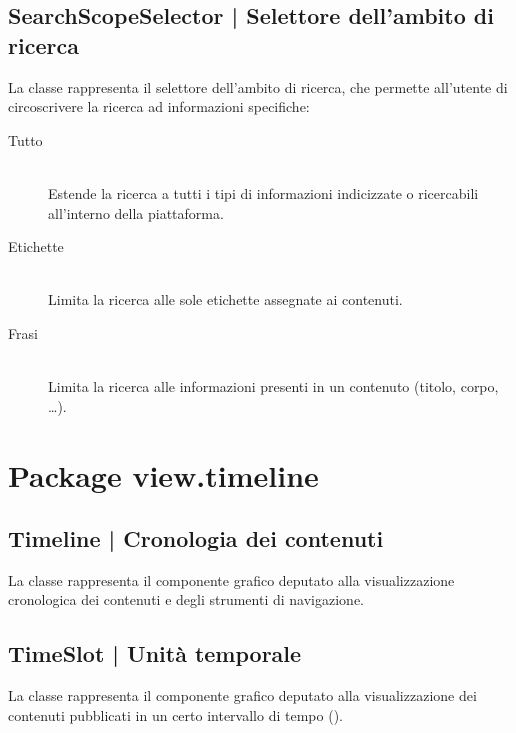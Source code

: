 \documentclass[10pt,a4paper,headinclude,footinclude,hidelinks]{scrreprt} %
\begin{document}
	\subsection[SearchScopeSelector]{SearchScopeSelector | Selettore dell'ambito di ricerca}
	\label{sec:stage:design:view.search:search-scope-selector}
	La classe \textit{} rappresenta il selettore dell'ambito di ricerca, che permette all'utente di circoscrivere la ricerca ad informazioni specifiche:
	\begin{description}
	\item[Tutto] \hfill \\
	Estende la ricerca a tutti i tipi di informazioni indicizzate o ricercabili all'interno della piattaforma.
 	\item[Etichette] \hfill \\
	Limita la ricerca alle sole etichette assegnate ai contenuti.
	\item[Frasi] \hfill \\
	Limita la ricerca alle informazioni presenti in un contenuto (titolo, corpo, \ldots).
	\end{description}

	\section{Package view.timeline}
	\label{sec:stage:design:view.timeline}

	\subsection[Timeline]{Timeline | Cronologia dei contenuti}
	\label{sec:stage:design:view.timeline:timeline-view}
	La classe \textit{} rappresenta il componente grafico deputato alla visualizzazione cronologica dei contenuti e degli strumenti di navigazione.

	\subsection[TimeSlot]{TimeSlot | Unità temporale}
	\label{sec:stage:design:view.timeline:time-slot}
	La classe \textit{} rappresenta il componente grafico deputato alla visualizzazione dei contenuti pubblicati in un certo intervallo di tempo (\textit{}).
\end{document}
